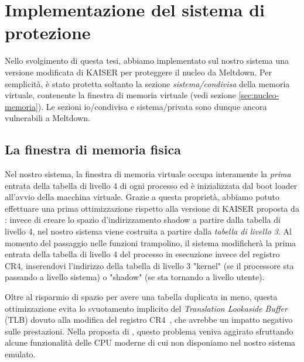 \chapter{Implementazione del sistema di protezione}
\label{cap:implementazione}
Nello svolgimento di questa tesi, abbiamo implementato sul nostro sistema una versione modificata di KAISER per proteggere il nucleo da Meltdown. 
Per semplicità, è stato protetta soltanto la sezione \emph{sistema/condivisa} della memoria virtuale, contenente la finestra di memoria virtuale (vedi sezione \vref{sec:nucleo-memoria}).
Le sezioni io/condivisa e sistema/privata sono dunque ancora vulnerabili a Meltdown.

\section{La finestra di memoria fisica}
Nel nostro sistema, la finestra di memoria virtuale occupa interamente la \emph{prima} entrata della tabella di livello 4 di ogni processo ed è inizializzata dal boot loader all'avvio della macchina virtuale.
Grazie a questa proprietà, abbiamo potuto effettuare una prima ottimizzazione rispetto alla versione di KAISER proposta da \textcite{gruss:kaslr}: invece di creare lo spazio d'indirizzamento shadow a partire dalla tabella di livello 4, nel nostro sistema viene costruita a partire dalla \emph{tabella di livello 3}.
Al momento del passaggio nelle funzioni trampolino, il sistema modificherà la prima entrata della tabella di livello 4 del processo in esecuzione invece del registro CR4, inserendovi l'indirizzo della tabella di livello 3 "kernel" (se il processore sta passando a livello sistema) o "shadow" (se sta tornando a livello utente).

Oltre al risparmio di spazio per avere una tabella duplicata in meno, questa ottimizzazione evita lo svuotamento implicito del \emph{Translation Lookaside Buffer} (TLB) dovuto alla modifica del registro CR4~\cite{gruss:kaslr}, che avrebbe un impatto negativo sulle prestazioni. 
Nella proposta di \textcite{gruss:kaslr}, questo problema veniva aggirato sfruttando alcune funzionalità delle CPU moderne di cui non disponiamo nel nostro sistema emulato.


